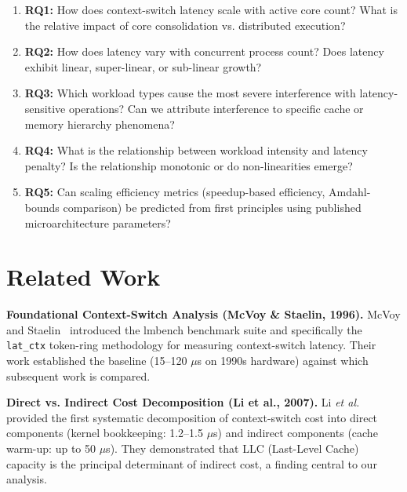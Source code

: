 \documentclass[conference]{IEEEtran}
\begin{document}
\begin{enumerate}
  \item \textbf{RQ1:} How does context-switch latency scale with active core
        count? What is the relative impact of core consolidation vs. distributed
        execution?
  
  \item \textbf{RQ2:} How does latency vary with concurrent process count? Does
        latency exhibit linear, super-linear, or sub-linear growth?
  
  \item \textbf{RQ3:} Which workload types cause the most severe interference
        with latency-sensitive operations? Can we attribute interference to
        specific cache or memory hierarchy phenomena?
  
  \item \textbf{RQ4:} What is the relationship between workload intensity and
        latency penalty? Is the relationship monotonic or do non-linearities
        emerge?
  
  \item \textbf{RQ5:} Can scaling efficiency metrics (speedup-based efficiency,
        Amdahl-bounds comparison) be predicted from first principles using
        published microarchitecture parameters?
\end{enumerate}

\section{Related Work}
\label{sec:related}

\textbf{Foundational Context-Switch Analysis (McVoy \& Staelin, 1996).}
McVoy and Staelin~\cite{mcvoy1996lmbench} introduced the lmbench benchmark
suite and specifically the \texttt{lat\_ctx} token-ring methodology for
measuring context-switch latency. Their work established the baseline (15--120
$\mu$s on 1990s hardware) against which subsequent work is compared.

\textbf{Direct vs. Indirect Cost Decomposition (Li et al., 2007).}
Li \textit{et al.}~\cite{li2007quantifying} provided the first systematic
decomposition of context-switch cost into direct components (kernel
bookkeeping: 1.2--1.5 $\mu$s) and indirect components (cache warm-up: up to
50 $\mu$s). They demonstrated that LLC (Last-Level Cache) capacity is the
principal determinant of indirect cost, a finding central to our analysis.
\end{document}
